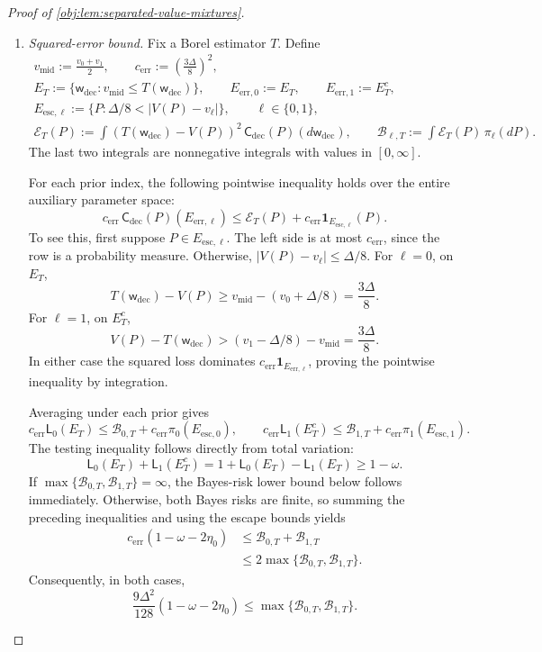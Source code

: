 \begin{proof}[Proof of \cref{obj:lem:separated-value-mixtures}]
\begin{enumerate}
\item \textit{Squared-error bound.}
Fix a Borel estimator \(T\). Define
\[
\begin{gathered}
v_{\mathrm{mid}}:=\frac{v_0+v_1}{2},
\qquad
c_{\mathrm{err}}:=\left(\frac{3\Delta}{8}\right)^2,\\
E_T:=\{\mathsf w_{\mathrm{dec}}:
v_{\mathrm{mid}}\le T(\mathsf w_{\mathrm{dec}})\},
\qquad
E_{\mathrm{err},0}:=E_T,
\qquad
E_{\mathrm{err},1}:=E_T^c,\\
E_{\mathrm{esc},\ell}
:=\{P:\Delta/8<|V(P)-v_\ell|\},
\qquad \ell\in\{0,1\},\\
\mathcal E_T(P)
:=
\int
(T(\mathsf w_{\mathrm{dec}})-V(P))^2\,
\mathsf C_{\mathrm{dec}}(P)(d\mathsf w_{\mathrm{dec}}),
\qquad
\mathcal B_{\ell,T}
:=
\int\mathcal E_T(P)\,\pi_\ell(dP).
\end{gathered}
\]
The last two integrals are nonnegative integrals with values in
\([0,\infty]\).

For each prior index, the following pointwise inequality holds over the entire auxiliary parameter space:
\[
c_{\mathrm{err}}\,
\mathsf C_{\mathrm{dec}}(P)(E_{\mathrm{err},\ell})
\le
\mathcal E_T(P)
+
c_{\mathrm{err}}\mathbf1_{E_{\mathrm{esc},\ell}}(P).
\]
To see this, first suppose \(P\in E_{\mathrm{esc},\ell}\). The left side is at most \(c_{\mathrm{err}}\), since the row is a probability measure. Otherwise,
\(|V(P)-v_\ell|\le\Delta/8\). For \(\ell=0\), on \(E_T\),
\[
T(\mathsf w_{\mathrm{dec}})-V(P)
\ge v_{\mathrm{mid}}-(v_0+\Delta/8)
=\frac{3\Delta}{8}.
\]
For \(\ell=1\), on \(E_T^c\),
\[
V(P)-T(\mathsf w_{\mathrm{dec}})
>
(v_1-\Delta/8)-v_{\mathrm{mid}}
=\frac{3\Delta}{8}.
\]
In either case the squared loss dominates
\(c_{\mathrm{err}}\mathbf1_{E_{\mathrm{err},\ell}}\), proving the pointwise inequality by integration.

Averaging under each prior gives
\[
c_{\mathrm{err}}\mathsf L_0(E_T)
\le\mathcal B_{0,T}+c_{\mathrm{err}}\pi_0(E_{\mathrm{esc},0}),
\qquad
c_{\mathrm{err}}\mathsf L_1(E_T^c)
\le\mathcal B_{1,T}+c_{\mathrm{err}}\pi_1(E_{\mathrm{esc},1}).
\]
The testing inequality follows directly from total variation:
\[
\mathsf L_0(E_T)+\mathsf L_1(E_T^c)
=
1+\mathsf L_0(E_T)-\mathsf L_1(E_T)
\ge1-\omega.
\]
If \(\max\{\mathcal B_{0,T},\mathcal B_{1,T}\}=\infty\), the Bayes-risk lower bound below follows immediately. Otherwise, both Bayes risks are finite, so summing the preceding inequalities and using the escape bounds yields
\[
\begin{aligned}
c_{\mathrm{err}}(1-\omega-2\eta_0)
&\le \mathcal B_{0,T}+\mathcal B_{1,T}\\
&\le2\max\{\mathcal B_{0,T},\mathcal B_{1,T}\}.
\end{aligned}
\]
Consequently, in both cases,
\[
\frac{9\Delta^2}{128}(1-\omega-2\eta_0)
\le\max\{\mathcal B_{0,T},\mathcal B_{1,T}\}.
\]


\end{enumerate}
\end{proof}

